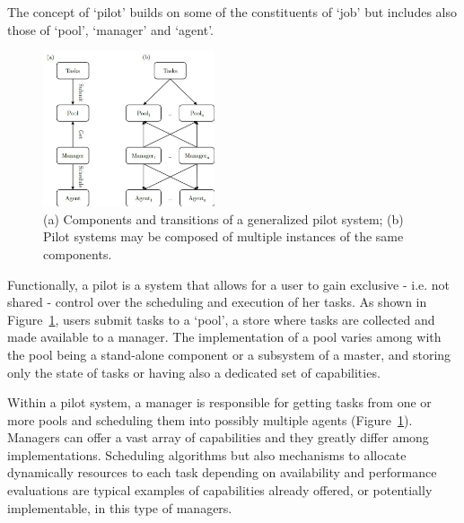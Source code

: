 \documentclass{sig-alternate}
\begin{document}

The concept of `pilot' builds on some of the constituents of `job'
but includes also those of `pool', `manager' and `agent'. 


\begin{figure} [t]
	\centering
	\includegraphics[width=0.45\textwidth]{figures/pilot_section3_1}
	\caption{(a) Components and transitions of a generalized pilot
		system; (b) Pilot systems may be composed of multiple
	  instances of the same components. }
	\label{fig:s3_pilot_diagram}
\end{figure}


Functionally, a pilot is a system that allows for a user to gain exclusive - i.e. not shared - control over the scheduling and execution of her tasks. As shown in Figure~\ref{fig:s3_pilot_diagram}, users submit tasks to a `pool', a store where tasks are collected and made available to a manager. The implementation of a pool varies among \pilotjobs with the pool being a stand-alone component or a subsystem of a master, and storing only the state of tasks or having also a dedicated set of capabilities.


Within a pilot system, a manager is responsible for getting tasks from one or more pools and scheduling them into possibly multiple agents (Figure~\ref{fig:s3_pilot_diagram}). Managers can offer a vast array of capabilities and they greatly differ among \pilotjob implementations. Scheduling algorithms but also mechanisms to allocate dynamically resources to each task depending on availability and performance evaluations are typical examples of capabilities already offered, or potentially implementable, in this type of managers.
\end{document}
